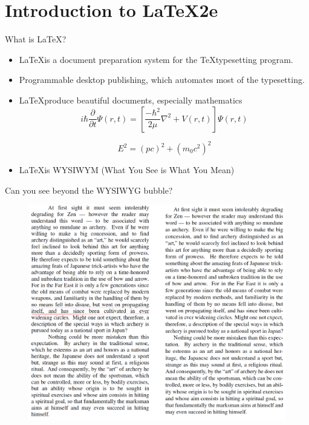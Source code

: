 \documentclass[10pt,times]{beamer}
\subtitle{Part I: Introduction to \LaTeX}
\begin{document}
\begin{frame}
  \titlepage
\end{frame}

\section{Introduction to \LaTeX2e}


\begin{frame}{What is \LaTeX?}
\begin{itemize}
\item \LaTeX is a document preparation system for the \TeX typesetting 
program. 

\item Programmable desktop publishing, which automates most of the typesetting.

\item \LaTeX produce beautiful documents, especially mathematics
\begin{equation*}
i \hbar \frac{\partial}{\partial t} \Psi(r,t) = 
\left[\frac{-\hbar^2}{2\mu}\nabla^2+V(r,t)\right]\Psi(r,t)
\end{equation*}

\begin{equation*}
E^2 = (pc)^2 + (m_0 c^2)^2
\end{equation*}

\item \LaTeX is WYSIWYM (What You See is What You Mean)

\end{itemize}
\end{frame}


\begin{frame}{Can you see beyond the WYSIWYG bubble?}
\begin{figure}
\includegraphics[height=0.85\textheight]{figs/LaTeX_Word.png}
\end{figure}
\end{frame}
\end{document}
